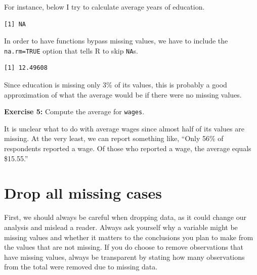 \documentclass[
]{book}
\makeatletter
\newenvironment{Shaded}{\begin{snugshade}}{\end{snugshade}}
\newcommand{\AttributeTok}[1]{\textcolor[rgb]{0.27,0.27,0.27}{#1}}
\newcommand{\ConstantTok}[1]{\textcolor[rgb]{0.37,0.37,0.37}{#1}}
\newcommand{\FunctionTok}[1]{\textcolor[rgb]{0.27,0.27,0.27}{\textbf{#1}}}
\newcommand{\NormalTok}[1]{#1}
\newcommand{\SpecialCharTok}[1]{\textcolor[rgb]{0.43,0.43,0.43}{\textbf{#1}}}
\newenvironment{kframe}{%
\medskip{}
\setlength{\fboxsep}{.8em}
 \def\at@end@of@kframe{}%
 \ifinner\ifhmode%
  \def\at@end@of@kframe{\end{minipage}}%
  \begin{minipage}{\columnwidth}%
 \fi\fi%
 \def\FrameCommand##1{\hskip\@totalleftmargin \hskip-\fboxsep
 \colorbox{shadecolor}{##1}\hskip-\fboxsep
     \hskip-\linewidth \hskip-\@totalleftmargin \hskip\columnwidth}%
 \MakeFramed {\advance\hsize-\width
   \@totalleftmargin\z@ \linewidth\hsize
   \@setminipage}}%
 {\par\unskip\endMakeFramed%
 \at@end@of@kframe}
\renewenvironment{Shaded}{\begin{kframe}}{\end{kframe}}
\newenvironment{rmdblock}[1]
  {\begin{shaded*}
  }
  {\end{shaded*}
  }
\newenvironment{learncheck}
  {\begin{rmdblock}{warning}}
  {\end{rmdblock}}
\makeatother
\begin{document}
For instance, below I try to calculate average years of education.

\begin{Shaded}
\end{Shaded}

\begin{verbatim}
[1] NA
\end{verbatim}

In order to have functions bypass missing values, we have to include the \texttt{na.rm=TRUE} option that tells R to skip \texttt{NA}s.

\begin{Shaded}
\end{Shaded}

\begin{verbatim}
[1] 12.49608
\end{verbatim}

Since education is missing only 3\% of its values, this is probably a good approximation of what the average would be if there were no missing values.

\begin{learncheck}
\textbf{Exercise 5:} Compute the average for \texttt{wages}.
\end{learncheck}

It is unclear what to do with average wages since almost half of its values are missing. At the very least, we can report something like, ``Only 56\% of respondents reported a wage. Of those who reported a wage, the average equals \$15.55.''

\hypertarget{drop-all-missing-cases}{%
\section{Drop all missing cases}\label{drop-all-missing-cases}}

First, we should always be careful when dropping data, as it could change our analysis and mislead a reader. Always ask yourself why a variable might be missing values and whether it matters to the conclusions you plan to make from the values that are not missing. If you do choose to remove observations that have missing values, always be transparent by stating how many observations from the total were removed due to missing data.
\end{document}
